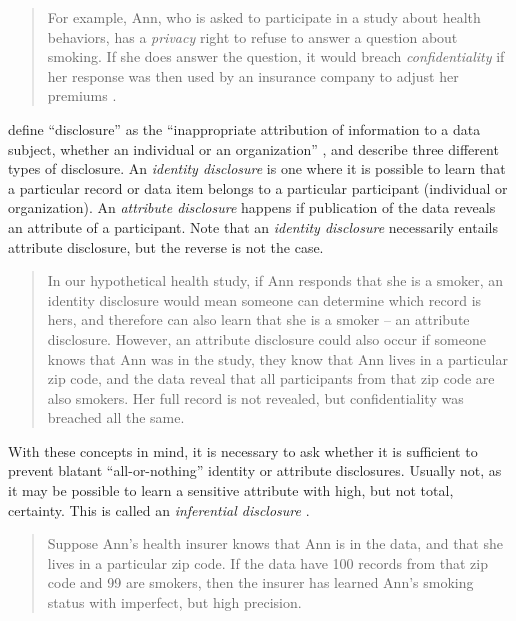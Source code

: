 \documentclass[
]{book}
\begin{document}
\begin{quote}
For example, Ann, who is asked to participate in a study about health behaviors, has a \emph{privacy} right to refuse to answer a question about smoking. If she does answer the question, it would breach \emph{confidentiality} if her response was then used by an insurance company to adjust her premiums \citep{duncan_private_1993}.
\end{quote}

\citet{harris-kojetin_statistical_2005} define ``disclosure'' as the ``inappropriate attribution of information to a data subject, whether an individual or an organization'' \citep[p.~4]{harris-kojetin_statistical_2005}, and describe three different types of disclosure. An \emph{identity disclosure} is one where it is possible to learn that a particular record or data item belongs to a particular participant (individual or organization). An \emph{attribute disclosure} happens if publication of the data reveals an attribute of a participant. Note that an \emph{identity disclosure} necessarily entails attribute disclosure, but the reverse is not the case.

\begin{quote}
In our hypothetical health study, if Ann responds that she is a smoker, an identity disclosure would mean someone can determine which record is hers, and therefore can also learn that she is a smoker -- an attribute disclosure. However, an attribute disclosure could also occur if someone knows that Ann was in the study, they know that Ann lives in a particular zip code, and the data reveal that all participants from that zip code are also smokers. Her full record is not revealed, but confidentiality was breached all the same.
\end{quote}

With these concepts in mind, it is necessary to ask whether it is sufficient to prevent blatant ``all-or-nothing'' identity or attribute disclosures. Usually not, as it may be possible to learn a sensitive attribute with high, but not total, certainty. This is called an \emph{inferential disclosure} \citep{dalenius_towards_1977, duncan_disclosure-limited_1986}.

\begin{quote}
Suppose Ann's health insurer knows that Ann is in the data, and that she lives in a particular zip code. If the data have 100 records from that zip code and 99 are smokers, then the insurer has learned Ann's smoking status with imperfect, but high precision.
\end{quote}
\end{document}
